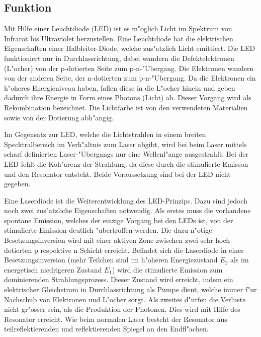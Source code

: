 \begin{refsection}
\subsection{Funktion}
Mit Hilfe einer Leuchtdiode (LED) ist es m"oglich Licht im Spektrum von 
Infrarot bis Ultraviolet herzustellen. Eine Leuchtdiode hat die elektrischen 
Eigenschaften einer Halbleiter-Diode, welche zus"atzlich Licht emittiert. Die 
LED funktioniert nur in Durchlassrichtung, dabei wandern die 
Defektelektronen (L"ocher) von der p-dotierten Seite zum p-n-"Ubergang. Die 
Elektronen wandern von der anderen Seite, der n-dotierten zum p-n-"Ubergang. 
Da die Elektronen ein h"oheres Energieniveau haben, fallen diese in die 
L"ocher hinein und geben dadurch ihre Energie in Form eines Photons (Licht) 
ab. Dieser Vorgang wird als Rekombination bezeichnet. Die Lichtfarbe ist von 
den verwendeten Materialien sowie von der Dotierung abh"angig.

Im Gegensatz zur LED, welche die Lichtstrahlen in einem breiten Specktralbereich im 
Verh"altnis zum Laser abgibt, wird bei beim Laser mittels scharf definierten 
Laser-"Ubergangs nur eine Wellenl"ange ausgestrahlt.  
Bei der LED fehlt die Koh"arenz der Strahlung, da 
diese durch die stimulierte Emisson und den Resonator entsteht. Beide 
Voraussetzung sind bei der LED nicht gegeben. 

Eine Laserdiode ist die Weiterentwicklung des LED-Prinzips. Dazu sind jedoch 
noch zwei zus"atzliche Eigenschaften notwendig. Als erstes muss die vorhandene 
spontane Emission, welches der einzige Vorgang bei den LEDs ist, von der 
stimulierte Emission deutlich "ubertroffen werden. Die dazu n"otige 
Besetzungsinversion wird mit einer aktiven Zone zwischen zwei sehr hoch 
dotierten p respektive n Schicht erreicht. Befindet sich die Laserdiode in 
einer Besetzungsinversion (mehr Teilchen sind im h"oheren Energiezustand $E_2$ 
als im energetisch niedrigeren Zustand $E_1$) wird die stimulierte Emission zum 
dominierenden Strahlungsprozess. Dieser Zustand wird erreicht, indem ein 
elektrischer Gleichstrom in Durchlassrichtung als Pumpe dient, welche immer 
f"ur Nachschub von Elektronen und L"ocher sorgt. Als zweites d"urfen die 
Verluste nicht gr"osser sein, als die Produktion der Photonen.
Dies wird mit Hilfe des Resonator erreicht.
Wie beim normalen Laser besteht der Resonator aus teilreflektierenden 
und reflektierenden Spiegel an den Endfl"achen.


\end{refsection}
